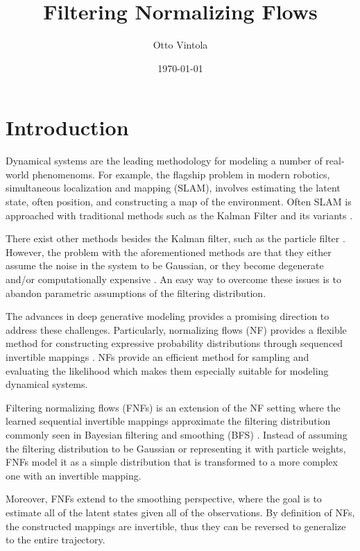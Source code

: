 \documentclass[11pt,a4paper]{article}
\title{Filtering Normalizing Flows}
\author{Otto Vintola}
\date{\today}
\begin{document}
\maketitle

\vspace{45pt}

\section{Introduction}

Dynamical systems are the leading methodology for modeling a number of real-world phenomenoms. For example, the flagship problem in modern robotics, simultaneous localization and mapping (SLAM), involves estimating the latent state, often position, and constructing a map of the environment. Often SLAM is approached with traditional methods such as the Kalman Filter \cite{Kalman} and its variants \cite{dorvash2023enhancedunscentedkalmanfilterbased,SLAMKalmanYin,SASAOKA2016303,YangKalman}.

There exist other methods besides the Kalman filter, such as the particle filter \cite{gordon1993novel}. However, the problem with the aforementioned methods are that they either assume the noise in the system to be Gaussian, or they become degenerate and/or computationally expensive \cite{doucet2000sequential,arulampalam2002tutorial}. An easy way to overcome these issues is to abandon parametric assumptions of the filtering distribution. 

The advances in deep generative modeling provides a promising direction to address these challenges. Particularly, normalizing flows (NF) provides a flexible method for constructing expressive probability distributions through sequenced invertible mappings \cite{rezende2015variational,dinh2017density,kingma2018glow}. NFs provide an efficient method for sampling and evaluating the likelihood which makes them especially suitable for modeling dynamical systems. 

Filtering normalizing flows (FNFs) is an extension of the NF setting where the learned sequential invertible mappings approximate the filtering distribution commonly seen in Bayesian filtering and smoothing (BFS) \cite{sarkka2023bayesian}. Instead of assuming the filtering distribution to be Gaussian or representing it with particle weights, FNFs model it as a simple distribution that is transformed to a more complex one with an invertible mapping. 

Moreover, FNFs extend to the smoothing perspective, where the goal is to estimate all of the latent states given all of the observations. By definition of NFs, the constructed mappings are invertible, thus they can be reversed to generalize to the entire trajectory. 
\end{document}
